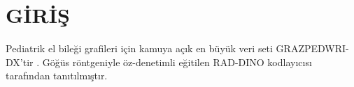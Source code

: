 \section{GİRİŞ}


Pediatrik el bileği grafileri için kamuya açık en büyük veri seti GRAZPEDWRI-DX'tir \citep{nagyPediatricWristTrauma2022}. Göğüs röntgeniyle öz-denetimli eğitilen RAD-DINO kodlayıcısı \citet{perez-garciaExploringScalableMedical2025} tarafından tanıtılmıştır.
